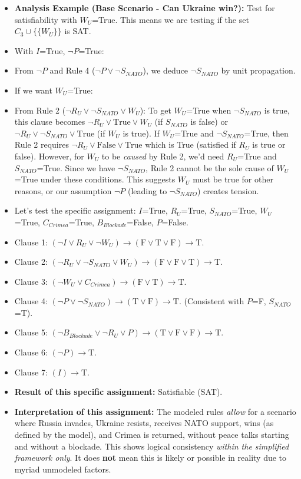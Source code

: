 \documentclass[11pt, a4paper]{article}
\begin{document}
\begin{itemize}
    \item \textbf{Analysis Example (Base Scenario - Can Ukraine win?):} Test for satisfiability with $W_U$=True.
        This means we are testing if the set $C_3 \cup \{\{W_U\}\}$ is SAT.
        \item With $I$=True, $\neg P$=True:
            \item From $\neg P$ and Rule 4 ($\neg P \vee \neg S_{NATO}$), we deduce $\neg S_{NATO}$ by unit propagation.
            \item If we want $W_U$=True:
                \item From Rule 2 ($\neg R_U \vee \neg S_{NATO} \vee W_U$): To get $W_U$=True when $\neg S_{NATO}$ is true, this clause becomes $\neg R_U \vee \text{True} \vee W_U$ (if $S_{NATO}$ is false) or $\neg R_U \vee \neg S_{NATO} \vee \text{True}$ (if $W_U$ is true).
                If $W_U$=True and $\neg S_{NATO}$=True, then Rule 2 requires $\neg R_U \vee \text{False} \vee \text{True}$ which is True (satisfied if $R_U$ is true or false).
                However, for $W_U$ to be \textit{caused} by Rule 2, we'd need $R_U$=True and $S_{NATO}$=True. Since we have $\neg S_{NATO}$, Rule 2 cannot be the sole cause of $W_U$=True under these conditions. This suggests $W_U$ must be true for other reasons, or our assumption $\neg P$ (leading to $\neg S_{NATO}$) creates tension.
        \item Let's test the specific assignment: $I$=True, $R_U$=True, $S_{NATO}$=True, $W_U$=True, $C_{Crimea}$=True, $B_{Blockade}$=False, $P$=False.
            \item Clause 1: $(\neg I \vee R_U \vee \neg W_U) \rightarrow (\text{F} \vee \text{T} \vee \text{F}) \rightarrow \text{T}$.
            \item Clause 2: $(\neg R_U \vee \neg S_{NATO} \vee W_U) \rightarrow (\text{F} \vee \text{F} \vee \text{T}) \rightarrow \text{T}$.
            \item Clause 3: $(\neg W_U \vee C_{Crimea}) \rightarrow (\text{F} \vee \text{T}) \rightarrow \text{T}$.
            \item Clause 4: $(\neg P \vee \neg S_{NATO}) \rightarrow (\text{T} \vee \text{F}) \rightarrow \text{T}$. (Consistent with $P$=F, $S_{NATO}$=T).
            \item Clause 5: $(\neg B_{Blockade} \vee \neg R_U \vee P) \rightarrow (\text{T} \vee \text{F} \vee \text{F}) \rightarrow \text{T}$.
            \item Clause 6: $(\neg P) \rightarrow \text{T}$.
            \item Clause 7: $(I) \rightarrow \text{T}$.
        \item \textbf{Result of this specific assignment:} Satisfiable (SAT).
        \item \textbf{Interpretation of this assignment:} The modeled rules \textit{allow} for a scenario where Russia invades, Ukraine resists, receives NATO support, wins (as defined by the model), and Crimea is returned, without peace talks starting and without a blockade. This shows logical consistency \textit{within the simplified framework only}. It does \textbf{not} mean this is likely or possible in reality due to myriad unmodeled factors.


\end{itemize}
\end{document}
